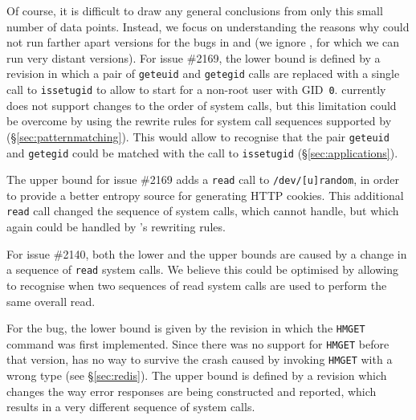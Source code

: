 Of course, it is difficult to draw any general conclusions from only
this small number of data points.  Instead, we focus on understanding
the reasons why \mx could not run farther apart versions for the bugs
in \lighttpd and \redis (we ignore \coreutils, for which we can run
very distant versions).
%
For \lighttpd issue \#2169, the lower bound is defined by a revision
in which a pair of \lstinline`geteuid` and \lstinline`getegid` calls
are replaced with a single call to \lstinline`issetugid` to
allow \lighttpd to start for a non-root user with GID~\lstinline`0`. \mx 
currently does not support changes to the order of system calls, but
this limitation could be overcome by using the rewrite rules for system call
sequences supported  by \varan (\S\ref{sec:patternmatching}). This would
allow \mx to recognise that the pair \lstinline`geteuid` and
\lstinline`getegid` could be matched with the call to
\lstinline`issetugid` (\S\ref{sec:applications}).

The upper bound for \lighttpd issue \#2169 adds a \lstinline`read` call to
\texttt{/dev/[u]random}, in order to provide a better entropy source for
generating HTTP cookies.  This additional \lstinline`read` call changed the
sequence of system calls, which \mx cannot handle, but which again could be
handled by \varan's rewriting rules.

For \lighttpd issue \#2140, both the lower and the upper bounds are
caused by a change in a sequence of \lstinline`read` system calls.  We
believe this could be optimised by allowing \mx to recognise when two
sequences of read system calls are used to perform the same overall
read.


For the \redis bug, the lower bound is given by the revision in which the
\lstinline`HMGET` command was first implemented.  Since there was no support for
\lstinline`HMGET` before that version, \mx has no way to survive the crash caused
by invoking \lstinline`HMGET` with a wrong type (see \S\ref{sec:redis}).  The
upper bound is defined by a revision which changes the way error responses are
being constructed and reported, which results in a very different sequence of
system calls.

